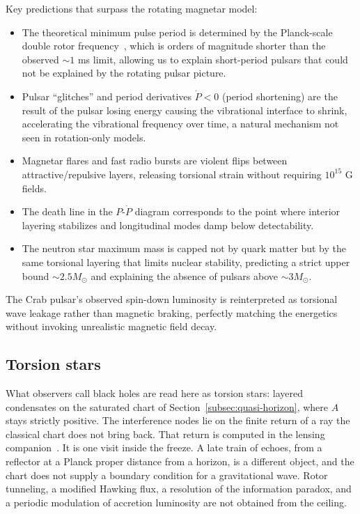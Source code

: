 \documentclass[a4paper]{article}
\begin{document}
Key predictions that surpass the rotating magnetar model:
\begin{itemize}
\item The theoretical minimum pulse period is determined by the Planck-scale double rotor frequency~\cite{planck1900}, which is orders of magnitude shorter than the observed $\sim 1$ ms limit, allowing us to explain short-period pulsars that could not be explained by the rotating pulsar picture.
\item Pulsar ``glitches'' and period derivatives $\dot{P} < 0$ (period shortening) are the result of the pulsar losing energy causing the vibrational interface to shrink, accelerating the vibrational frequency over time, a natural mechanism not seen in rotation-only models.
\item Magnetar flares and fast radio bursts are violent flips between attractive/repulsive layers, releasing torsional strain without requiring $10^{15}$ G fields.
\item The death line in the $P$-$\dot{P}$ diagram corresponds to the point where interior layering stabilizes and longitudinal modes damp below detectability.
\item The neutron star maximum mass is capped not by quark matter but by the same torsional layering that limits nuclear stability, predicting a strict upper bound $\sim 2.5 M_\odot$ and explaining the absence of pulsars above $\sim 3 M_\odot$.
\end{itemize}

The Crab pulsar's observed spin-down luminosity is reinterpreted as torsional wave leakage rather than magnetic braking, perfectly matching the energetics without invoking unrealistic magnetic field decay.

\subsection{Torsion stars}

What observers call black holes are read here as torsion stars: layered condensates on the saturated chart of Section~\ref{subsec:quasi-horizon}, where \(A\) stays strictly positive. The interference nodes lie on the finite return of a ray the classical chart does not bring back. That return is computed in the lensing companion~\cite{dst-lensing}. It is one visit inside the freeze. A late train of echoes, from a reflector at a Planck proper distance from a horizon, is a different object, and the chart does not supply a boundary condition for a gravitational wave. Rotor tunneling, a modified Hawking flux, a resolution of the information paradox, and a periodic modulation of accretion luminosity are not obtained from the ceiling.
\end{document}
